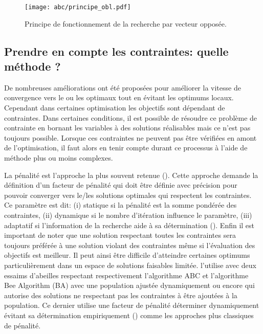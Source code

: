 \begin{figure}
    \begin{center}
        \texttt{[image: abc/principe\_obl.pdf]}
    \end{center}
    \caption{Principe de fonctionnement de la recherche par vecteur opposée.
             \label{fig:OBL_method}}
\end{figure}


\subsection{Prendre en compte les contraintes: quelle méthode ?} %
\label{sub:prendre_en_compte_les_contraintes_quelle_methode}

De nombreuses améliorations ont été proposées pour améliorer la vitesse de convergence
vers le ou les optimaux tout en évitant les optimums locaux. Cependant dans certaines
optimisation les objectifs sont dépendant de contraintes. Dans certaines conditions, il
est possible de résoudre ce problème de contrainte en bornant les variables à des solutions
réalisables mais ce n’est pas toujours possible. Lorsque ces contraintes ne peuvent pas être vérifiées
en amont de l’optimisation, il faut alors en tenir compte durant ce processus à l’aide
de méthode plus ou moins complexes.

La pénalité est l’approche la plus souvent retenue (\cite{EfrEnMezura-Montes2003}).
Cette approche demande la définition d’un facteur de pénalité qui doit être définie
avec précision pour pouvoir converger vers le/les solutions optimales qui respectent les
contraintes. Ce paramètre est dit: (i) statique si la pénalité est la somme pondérée des contraintes,
(ii) dynamique si le nombre d’itération influence le paramètre, (iii) adaptatif si l’information de la
recherche aide à sa détermination (\cite{Woldesenbet20073077}).
Enfin il est important de noter que une solution respectant toutes les contraintes sera toujours préférée
à une solution violant des contraintes même si l’évaluation des objectifs est meilleur. Il peut ainsi être
difficile d’atteindre certaines optimums particulièrement
dans un espace de solutions faisables limitée.
\cite{Tsai201480} l’utilise avec deux essaims d’abeilles respectant respectivement l’algorithme
ABC et l’algorithme Bee Algorithm (BA) avec une population ajustée dynamiquement ou encore \cite{Karaboga20113021}
qui autorise des solutions ne respectant pas les contraintes à être ajoutées à la population. Ce dernier
utilise une facteur de pénalité déterminer dynamiquement évitant sa détermination empiriquement (\cite{Deb2000311}) comme
les approches plus classiques de pénalité.
\\

